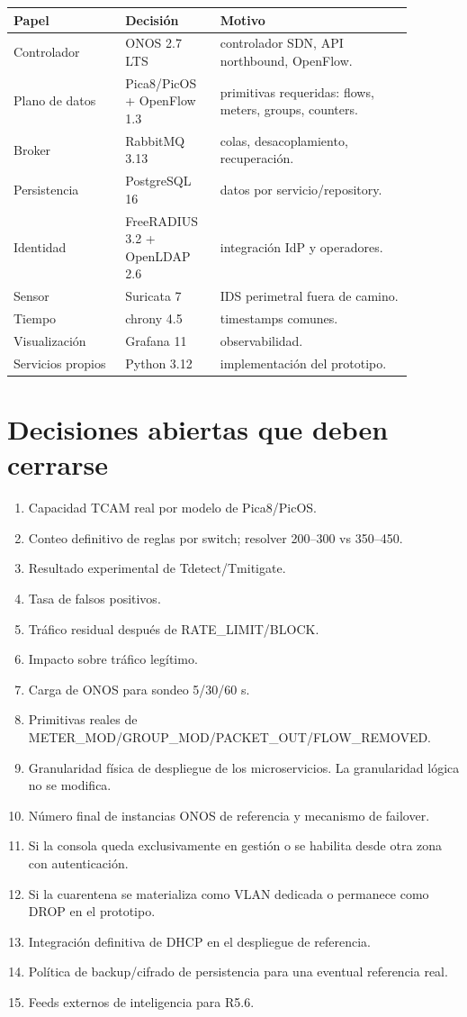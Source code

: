 \documentclass[11pt,a4paper]{article}
\begin{document}
\begin{longtable}{p{0.25\linewidth}p{0.2\linewidth}p{0.43\linewidth}}
\toprule
Papel & Decisión & Motivo\\
\midrule
Controlador & ONOS 2.7 LTS & controlador SDN, API northbound, OpenFlow.\\
Plano de datos & Pica8/PicOS + OpenFlow 1.3 & primitivas requeridas: flows, meters, groups, counters.\\
Broker & RabbitMQ 3.13 & colas, desacoplamiento, recuperación.\\
Persistencia & PostgreSQL 16 & datos por servicio/repository.\\
Identidad & FreeRADIUS 3.2 + OpenLDAP 2.6 & integración IdP y operadores.\\
Sensor & Suricata 7 & IDS perimetral fuera de camino.\\
Tiempo & chrony 4.5 & timestamps comunes.\\
Visualización & Grafana 11 & observabilidad.\\
Servicios propios & Python 3.12 & implementación del prototipo.\\
\bottomrule
\end{longtable}

\section{Decisiones abiertas que deben cerrarse}

\begin{enumerate}
\item Capacidad TCAM real por modelo de Pica8/PicOS.
\item Conteo definitivo de reglas por switch; resolver 200--300 vs 350--450.
\item Resultado experimental de Tdetect/Tmitigate.
\item Tasa de falsos positivos.
\item Tráfico residual después de RATE\_LIMIT/BLOCK.
\item Impacto sobre tráfico legítimo.
\item Carga de ONOS para sondeo 5/30/60 s.
\item Primitivas reales de METER\_MOD/GROUP\_MOD/PACKET\_OUT/FLOW\_REMOVED.
\item Granularidad física de despliegue de los microservicios. La granularidad lógica no se modifica.
\item Número final de instancias ONOS de referencia y mecanismo de failover.
\item Si la consola queda exclusivamente en gestión o se habilita desde otra zona con autenticación.
\item Si la cuarentena se materializa como VLAN dedicada o permanece como DROP en el prototipo.
\item Integración definitiva de DHCP en el despliegue de referencia.
\item Política de backup/cifrado de persistencia para una eventual referencia real.
\item Feeds externos de inteligencia para R5.6.
\end{enumerate}
\end{document}
